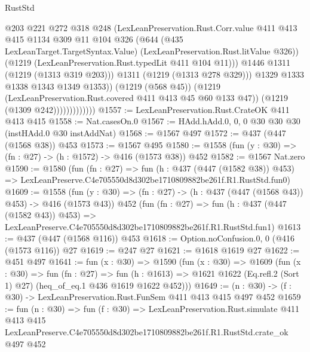 \begin{lexlean}{RustStd}
\begin{coremodule}
                                  @203
                                  @221
                                  @272
                                  @318
                                  @248
                                  (LexLeanPreservation.Rust.Corr.value
                                    @411
                                    @413
                                    @415
                                    @1134
                                    @309
                                    @11
                                    @104
                                    @326
                                    (@644
                                      (@435 LexLeanTarget.TargetSyntax.Value)
                                      (LexLeanPreservation.Rust.litValue @326))
                                    (@1219 (LexLeanPreservation.Rust.typedLit @411 @104 @11)))
                                  @1446
                                  @1311
                                  (@1219 (@1313 @319 @203)))
                                @1311
                                (@1219 (@1313 @278 @329)))
                              @1329
                              @1333
                              @1338
                              @1343
                              @1349
                              @1353))
                          (@1219 (@568 @45))
                          (@1219 (LexLeanPreservation.Rust.covered @411 @413 @45 @60 @133 @47))
                          (@1219 (@1309 @242)))))))))))))
@1557 := LexLeanPreservation.Rust.CrateOK @411 @413 @415
@1558 := Nat.casesOn.{0}
@1567 := HAdd.hAdd.{0, 0, 0} @30 @30 @30 (instHAdd.{0} @30 instAddNat)
@1568 := @1567 @497
@1572 := @437 (@447 (@1568 @38)) @453
@1573 := @1567 @495
@1580 := @1558 (fun (y : @30) => (fn : @27) -> (h : @1572) -> @416 (@1573 @38)) @452
@1582 := @1567 Nat.zero
@1590 := @1580
    (fun (fn : @27) =>
    fun (h : @437 (@447 (@1582 @38)) @453) =>
    LexLeanPreserve.C4e705550d8d302be1710809882be261f.R1.RustStd.fun0)
@1609 := @1558
    (fun (y : @30) => (fn : @27) -> (h : @437 (@447 (@1568 @43)) @453) -> @416 (@1573 @43))
    @452
    (fun (fn : @27) =>
    fun (h : @437 (@447 (@1582 @43)) @453) =>
    LexLeanPreserve.C4e705550d8d302be1710809882be261f.R1.RustStd.fun1)
@1613 := @437 (@447 (@1568 @116)) @453
@1618 := Option.noConfusion.{0, 0} (@416 (@1573 @116)) @27
@1619 := @247 @27
@1621 := @1618 @1619 @27
@1622 := @451 @497
@1641 := fun (x : @30) =>
  @1590
    (fun (x : @30) =>
    @1609
      (fun (x : @30) =>
      fun (fn : @27) =>
      fun (h : @1613) =>
      @1621 @1622 (Eq.refl.{2} (Sort 1) @27) (heq_of_eq.{1} @436 @1619 @1622 @452)))
@1649 := (n : @30) -> (f : @30) -> LexLeanPreservation.Rust.FunSem @411 @413 @415 @497 @452
@1659 := fun (n : @30) =>
  fun (f : @30) =>
  LexLeanPreservation.Rust.simulate
    @411
    @413
    @415
    LexLeanPreserve.C4e705550d8d302be1710809882be261f.R1.RustStd.crate_ok
    @497
    @452
\end{coremodule}
\end{lexlean}

